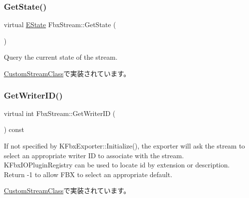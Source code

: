 \mbox{\label{class_fbx_stream_a602172d138a0fc5c4cb3443b2b925296}} 
\subsubsection{\texorpdfstring{Get\+State()}{GetState()}}
{\footnotesize\ttfamily virtual \hyperlink{class_fbx_stream_adc469d38eb30339fa4190eb6c66ec8f7}{E\+State} Fbx\+Stream\+::\+Get\+State (\begin{DoxyParamCaption}{ }\end{DoxyParamCaption})\hspace{0.3cm}{\ttfamily [pure virtual]}}

Query the current state of the stream. 

\hyperlink{class_custom_stream_class_a75de6f5f3a8ea2d51a40ebfa34f20448}{Custom\+Stream\+Class}で実装されています。

\mbox{\label{class_fbx_stream_af39d714bf396c28252772b5d8e7caa47}} 
\subsubsection{\texorpdfstring{Get\+Writer\+I\+D()}{GetWriterID()}}
{\footnotesize\ttfamily virtual int Fbx\+Stream\+::\+Get\+Writer\+ID (\begin{DoxyParamCaption}{ }\end{DoxyParamCaption}) const\hspace{0.3cm}{\ttfamily [pure virtual]}}

If not specified by K\+Fbx\+Exporter\+::\+Initialize(), the exporter will ask the stream to select an appropriate writer ID to associate with the stream. K\+Fbx\+I\+O\+Plugin\+Registry can be used to locate id by extension or description. Return -\/1 to allow F\+BX to select an appropriate default. 

\hyperlink{class_custom_stream_class_a4fec56a5a7f65604c6e3eb2ce66fb3fb}{Custom\+Stream\+Class}で実装されています。

\mbox{\label{class_fbx_stream_ab8b3c6e904344c1b1d74e457ae8a74e7}} 
